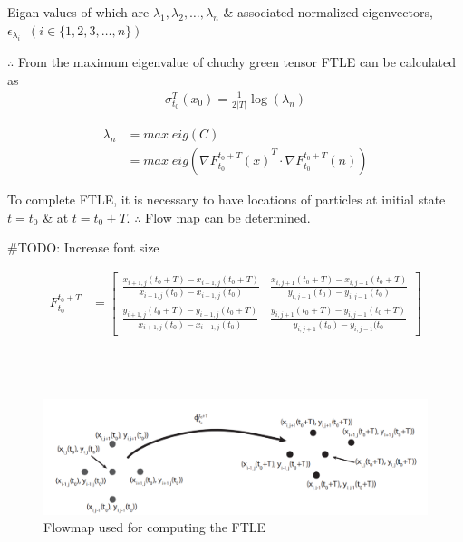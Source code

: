 \documentclass[../report.tex]{subfiles}
\begin{document}
Eigan values of which are \(\lambda_1, \lambda_2, \dots, \lambda_n\) \& associated normalized eigenvectors, \(\epsilon_{\lambda_i}\;\; (i \in \{1, 2, 3, \dots, n\})\)

\(\therefore\) From the maximum eigenvalue of chuchy green tensor FTLE can be calculated as
\begin{equation}
  \begin{aligned}
    \sigma_{t_0}^T (x_0) = \frac{1}{2|T|} \log(\lambda_n)
  \end{aligned}
\end{equation}

\begin{equation}
  \begin{aligned}
    \lambda_n &= max\; eig (C) \\
    &= max\; eig(\nabla {F_{t_0}^{t_0 + T}(x)}^T \cdot \nabla F_{t_0}^{t_0 + T}(n))
  \end{aligned}
\end{equation}

To complete FTLE, it is necessary to have locations of particles at initial state \(t = t_0\) \& at \(t = t_0 + T\). \(\therefore\) Flow map can be determined.

\#TODO: Increase font size

\begin{equation}
  \begin{aligned}
    {F_{t_0}^{t_0 + T}} &= \begin{bmatrix}
      \frac{x_{i + 1, j}(t_0 + T) - x_{i - 1, j}(t_0 + T)}{x_{i+1, j}(t_0) - x_{i-1, j}(t_0)} & \frac{x_{i, j+1}(t_0 + T) - x_{i,j-1}(t_0 + T)}{y_{i,j+1}(t_0) - y_{i,j-1}(t_0)} \\[12pt]
      
      \frac{y_{i+1, j}(t_0 + T) - y_{i-1, j}(t_0 + T)}{x_{i+1,j}(t_0) - x_{i-1, j}(t_0)} & \frac{y_{i,j+1}(t_0 + T) - y_{i, j - 1}(t_0 + T)}{y_{i, j+1}(t_0) - y_{i, j-1}(t_0}
    \end{bmatrix}
  \end{aligned}
\end{equation}


~ \\ ~ \\
\begin{figure}[H]
  \centering
  \includegraphics[width=0.8\linewidth]{images/image_1.png}
  \caption{Flowmap used for computing the FTLE}
  \label{fig:fig-1}
\end{figure}
\end{document}
